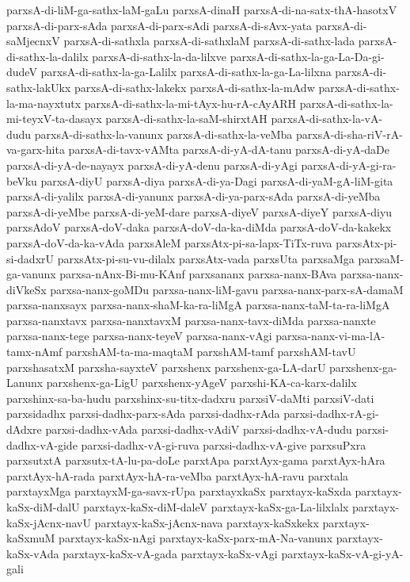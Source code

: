 {parxsA-di-liM-ga-sathx-laM-gaLu
parxsA-dinaH
parxsA-di-na-satx-thA-hasotxV
parxsA-di-parx-sAda
parxsA-di-parx-sAdi
parxsA-di-sAvx-yata
parxsA-di-saMjecnxV
parxsA-di-sathxla
parxsA-di-sathxlaM
parxsA-di-sathx-lada
parxsA-di-sathx-la-dalilx
parxsA-di-sathx-la-da-lilxve
parxsA-di-sathx-la-ga-La-Da-gi-dudeV
parxsA-di-sathx-la-ga-Lalilx
parxsA-di-sathx-la-ga-La-lilxna
parxsA-di-sathx-lakUkx
parxsA-di-sathx-lakekx
parxsA-di-sathx-la-mAdw
parxsA-di-sathx-la-ma-nayxtutx
parxsA-di-sathx-la-mi-tAyx-hu-rA-cAyARH
parxsA-di-sathx-la-mi-teyxV-ta-dasayx
parxsA-di-sathx-la-saM-shirxtAH
parxsA-di-sathx-la-vA-dudu
parxsA-di-sathx-la-vanunx
parxsA-di-sathx-la-veMba
parxsA-di-sha-riV-rA-va-garx-hita
parxsA-di-tavx-vAMta
parxsA-di-yA-dA-tanu
parxsA-di-yA-daDe
parxsA-di-yA-de-nayayx
parxsA-di-yA-denu
parxsA-di-yAgi
parxsA-di-yA-gi-ra-beVku
parxsA-diyU
parxsA-diya
parxsA-di-ya-Dagi
parxsA-di-yaM-gA-liM-gita
parxsA-di-yalilx
parxsA-di-yanunx
parxsA-di-ya-parx-sAda
parxsA-di-yeMba
parxsA-di-yeMbe
parxsA-di-yeM-dare
parxsA-diyeV
parxsA-diyeY
parxsA-diyu
parxsAdoV
parxsA-doV-daka
parxsA-doV-da-ka-diMda
parxsA-doV-da-kakekx
parxsA-doV-da-ka-vAda
parxsAleM
parxsAtx-pi-sa-lapx-TiTx-ruva
parxsAtx-pi-si-dadxrU
parxsAtx-pi-su-vu-dilalx
parxsAtx-vada
parxsUta
parxsaMga
parxsaM-ga-vanunx
parxsa-nAnx-Bi-mu-KAnf
parxsananx
parxsa-nanx-BAva
parxsa-nanx-diVkeSx
parxsa-nanx-goMDu
parxsa-nanx-liM-gavu
parxsa-nanx-parx-sA-damaM
parxsa-nanxsayx
parxsa-nanx-shaM-ka-ra-liMgA
parxsa-nanx-taM-ta-ra-liMgA
parxsa-nanxtavx
parxsa-nanxtavxM
parxsa-nanx-tavx-diMda
parxsa-nanxte
parxsa-nanx-tege
parxsa-nanx-teyeV
parxsa-nanx-vAgi
parxsa-nanx-vi-ma-lA-tamx-nAmf
parxshAM-ta-ma-maqtaM
parxshAM-tamf
parxshAM-tavU
parxshasatxM
parxsha-sayxteV
parxshenx
parxshenx-ga-LA-darU
parxshenx-ga-Lanunx
parxshenx-ga-LigU
parxshenx-yAgeV
parxshi-KA-ca-karx-dalilx
parxshinx-sa-ba-hudu
parxshinx-su-titx-dadxru
parxsiV-daMti
parxsiV-dati
parxsidadhx
parxsi-dadhx-parx-sAda
parxsi-dadhx-rAda
parxsi-dadhx-rA-gi-dAdxre
parxsi-dadhx-vAda
parxsi-dadhx-vAdiV
parxsi-dadhx-vA-dudu
parxsi-dadhx-vA-gide
parxsi-dadhx-vA-gi-ruva
parxsi-dadhx-vA-give
parxsuPxra
parxsutxtA
parxsutx-tA-lu-pa-doLe
parxtApa
parxtAyx-gama
parxtAyx-hAra
parxtAyx-hA-rada
parxtAyx-hA-ra-veMba
parxtAyx-hA-ravu
parxtala
parxtayxMga
parxtayxM-ga-savx-rUpa
parxtayxkaSx
parxtayx-kaSxda
parxtayx-kaSx-diM-dalU
parxtayx-kaSx-diM-daleV
parxtayx-kaSx-ga-La-lilxlalx
parxtayx-kaSx-jAcnx-navU
parxtayx-kaSx-jAcnx-nava
parxtayx-kaSxkekx
parxtayx-kaSxmuM
parxtayx-kaSx-nAgi
parxtayx-kaSx-parx-mA-Na-vanunx
parxtayx-kaSx-vAda
parxtayx-kaSx-vA-gada
parxtayx-kaSx-vAgi
parxtayx-kaSx-vA-gi-yA-gali
}
